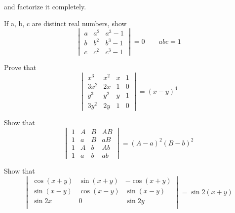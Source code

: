 \documentclass[11pt]{amsbook}
\begin{document}


and factorize it completely.
\setcounter{page}{264}
\setcounter{section}{3}
\setcounter{subsection}{2}
\setcounter{exercise}{36}
\begin{exercise}
	If a, b, c are distinct real numbers, show
	\begin{equation*}
		\begin{vmatrix}
			a	& a^2 & a^3-1 \\
			b	& b^2 & b^3-1 \\
			c	& c^2 & c^3-1 
		\end{vmatrix} 
		= 0
		\qquad
		abc = 1
	\end{equation*}
\end{exercise}
\begin{exercise}
	Prove that
	\begin{equation*}
		\begin{vmatrix}
			x^3 		& x^2 	& x 	& 1 \\
			3x^2 	& 2x 		& 1 	& 0 \\
			y^3		& y^2	& y	& 1 \\
			3y^2		& 2y		& 1	& 0
		\end{vmatrix}
		= (x-y)^4
	\end{equation*}
\end{exercise}
\begin{exercise}
	Show that
	\begin{equation*}
		\begin{vmatrix}
			1	& A 	& B 	& AB \\
			1	& a	& B 	& aB \\
			1	& A	& b	& Ab \\
			1	& a	& b	& ab
		\end{vmatrix}
		= (A-a)^2(B-b)^2
	\end{equation*}
\end{exercise}
\begin{exercise}
	Show that
	\begin{equation*}
		\begin{vmatrix}
			\cos{(x+y)}& \sin{(x+y)}	& -\cos{(x+y)}	\\
			\sin{(x-y)}	& \cos{(x-y)}	& \sin{(x-y)}	\\
			\sin{2x}	& 0			& \sin{2y} 		\\
		\end{vmatrix}
		= \sin{2(x+y)}
	\end{equation*}
\end{exercise}
\end{document}
